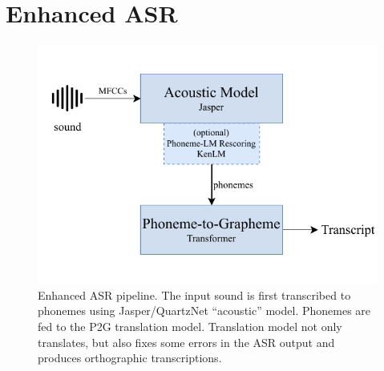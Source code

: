 \chapter{Enhanced ASR}
\label{chap:enhanced_asr}

\begin{figure}[t]
	\centering
	\includegraphics[width=.9\textwidth]{img/easr2}
	\caption[Enhanced ASR pipeline]{Enhanced ASR pipeline. The input sound is first transcribed to phonemes using Jasper/QuartzNet ``acoustic'' model. Phonemes are fed to the P2G translation model. Translation model not only translates, but also fixes some errors in the ASR output and produces orthographic transcriptions.}
	\label{fig:asr_enhanced_pipeline}
\end{figure} 


